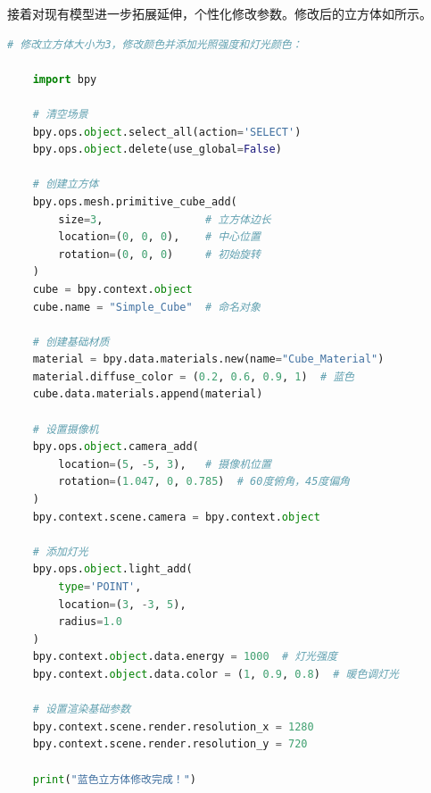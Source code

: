 
接着对现有模型进一步拓展延伸，个性化修改参数。修改后的立方体如所示。


\begin{gptbox} 
\small{
\begin{lstlisting}[language=Python]
    # 修改立方体大小为3，修改颜色并添加光照强度和灯光颜色：

    import bpy
    
    # 清空场景
    bpy.ops.object.select_all(action='SELECT')
    bpy.ops.object.delete(use_global=False)
    
    # 创建立方体
    bpy.ops.mesh.primitive_cube_add(
        size=3,                # 立方体边长
        location=(0, 0, 0),    # 中心位置
        rotation=(0, 0, 0)     # 初始旋转
    )
    cube = bpy.context.object
    cube.name = "Simple_Cube"  # 命名对象
    
    # 创建基础材质
    material = bpy.data.materials.new(name="Cube_Material")
    material.diffuse_color = (0.2, 0.6, 0.9, 1)  # 蓝色
    cube.data.materials.append(material)
    
    # 设置摄像机
    bpy.ops.object.camera_add(
        location=(5, -5, 3),   # 摄像机位置
        rotation=(1.047, 0, 0.785)  # 60度俯角，45度偏角
    )
    bpy.context.scene.camera = bpy.context.object
    
    # 添加灯光
    bpy.ops.object.light_add(
        type='POINT',
        location=(3, -3, 5),
        radius=1.0
    )
    bpy.context.object.data.energy = 1000  # 灯光强度
    bpy.context.object.data.color = (1, 0.9, 0.8)  # 暖色调灯光
    
    # 设置渲染基础参数
    bpy.context.scene.render.resolution_x = 1280
    bpy.context.scene.render.resolution_y = 720
    
    print("蓝色立方体修改完成！")

\end{lstlisting}
} 
\end{gptbox} 

